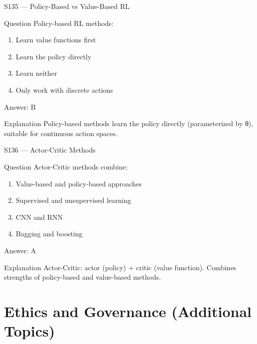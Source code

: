 \documentclass[aspectratio=169,8pt]{beamer}
\begin{document}
	\begin{frame}{S135 --- Policy-Based vs Value-Based RL}
		\begin{block}{Question}
			Policy-based RL methods:
			\begin{enumerate}
				\item Learn value functions first
				\item Learn the policy directly
				\item Learn neither
				\item Only work with discrete actions
			\end{enumerate}
		\end{block}
		\begin{exampleblock}{Answer: B}\end{exampleblock}
		\begin{block}{Explanation}
			Policy-based methods learn the policy directly (parameterized by θ), suitable for continuous action spaces.
		\end{block}
	\end{frame}
	
	\begin{frame}{S136 --- Actor-Critic Methods}
		\begin{block}{Question}
			Actor-Critic methods combine:
			\begin{enumerate}
				\item Value-based and policy-based approaches
				\item Supervised and unsupervised learning
				\item CNN and RNN
				\item Bagging and boosting
			\end{enumerate}
		\end{block}
		\begin{exampleblock}{Answer: A}\end{exampleblock}
		\begin{block}{Explanation}
			Actor-Critic: actor (policy) + critic (value function). Combines strengths of policy-based and value-based methods.
		\end{block}
	\end{frame}
	
	\section{Ethics and Governance (Additional Topics)}
	
\end{document}

